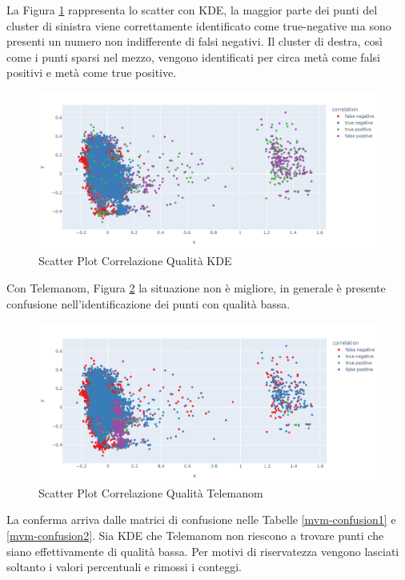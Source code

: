 La Figura \ref{kde_quality} rappresenta lo scatter con KDE, la maggior parte dei punti del cluster di sinistra viene correttamente identificato come true-negative ma sono presenti un numero non indifferente di falsi negativi. Il cluster di destra, così come i punti sparsi nel mezzo, vengono identificati per circa metà come falsi positivi e metà come true positive.
\begin{figure}[t]
	\centering
	\includegraphics[width=14cm, scale=1]{images/correlation_ssb1_quality_plot.png}
	\caption{Scatter Plot Correlazione Qualità KDE}
	\label{kde_quality}
\end{figure}

Con Telemanom, Figura \ref{worst_clf_quality} la situazione non è migliore, in generale è presente confusione nell'identificazione dei punti con qualità bassa.


\begin{figure}[t]
	\centering
	\includegraphics[width=14cm, scale=1]{images/worst_correlation_ssb1_quality_plot}
	\caption{Scatter Plot Correlazione Qualità Telemanom}
	\label{worst_clf_quality}
\end{figure}

La conferma arriva dalle matrici di confusione nelle Tabelle \ref{mvm-confusion1} e \ref{mvm-confusion2}. Sia KDE che Telemanom non riescono a trovare punti che siano effettivamente di qualità bassa. Per motivi di riservatezza vengono lasciati soltanto i valori percentuali e rimossi i conteggi.



